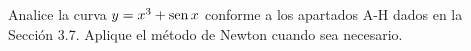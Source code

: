\item Analice la curva $y = x^3 + \operatorname{sen} x$ conforme a los apartados A-H dados en la Sección 3.7. Aplique el método de Newton cuando sea necesario.
